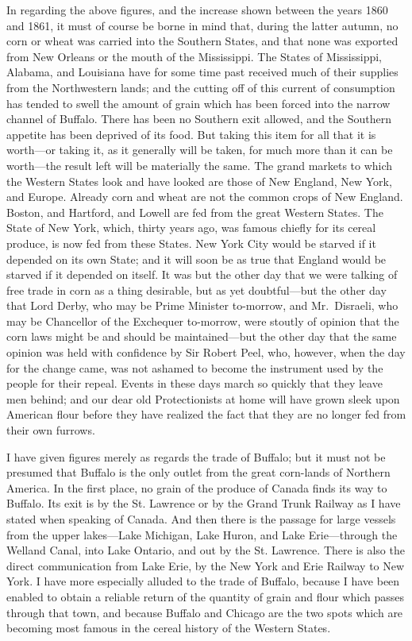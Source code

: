 In regarding the above figures, and the increase shown between the
years 1860 and 1861, it must of course be borne in mind that,
during the latter autumn, no corn or wheat was carried into the
Southern States, and that none was exported from New Orleans or the
mouth of the Mississippi.  The States of Mississippi, Alabama, and
Louisiana have for some time past received much of their supplies
from the Northwestern lands; and the cutting off of this current of
consumption has tended to swell the amount of grain which has been
forced into the narrow channel of Buffalo.  There has been no
Southern exit allowed, and the Southern appetite has been deprived
of its food.  But taking this item for all that it is worth---or
taking it, as it generally will be taken, for much more than it can
be worth---the result left will be materially the same.  The grand
markets to which the Western States look and have looked are those
of New England, New York, and Europe.  Already corn and wheat are
not the common crops of New England.  Boston, and Hartford, and
Lowell are fed from the great Western States.  The State of New
York, which, thirty years ago, was famous chiefly for its cereal
produce, is now fed from these States.  New York City would be
starved if it depended on its own State; and it will soon be as
true that England would be starved if it depended on itself.  It
was but the other day that we were talking of free trade in corn as
a thing desirable, but as yet doubtful---but the other day that Lord
Derby, who may be Prime Minister to-morrow, and Mr.\ Disraeli, who
may be Chancellor of the Exchequer to-morrow, were stoutly of
opinion that the corn laws might be and should be maintained---but
the other day that the same opinion was held with confidence by Sir
Robert Peel, who, however, when the day for the change came, was
not ashamed to become the instrument used by the people for their
repeal.  Events in these days march so quickly that they leave men
behind; and our dear old Protectionists at home will have grown
sleek upon American flour before they have realized the fact that
they are no longer fed from their own furrows.

I have given figures merely as regards the trade of Buffalo; but it
must not be presumed that Buffalo is the only outlet from the great
corn-lands of Northern America.  In the first place, no grain of
the produce of Canada finds its way to Buffalo.  Its exit is by the
St. Lawrence or by the Grand Trunk Railway as I have stated when
speaking of Canada.  And then there is the passage for large
vessels from the upper lakes---Lake Michigan, Lake Huron, and Lake
Erie---through the Welland Canal, into Lake Ontario, and out by the
St. Lawrence.  There is also the direct communication from Lake
Erie, by the New York and Erie Railway to New York.  I have more
especially alluded to the trade of Buffalo, because I have been
enabled to obtain a reliable return of the quantity of grain and
flour which passes through that town, and because Buffalo and
Chicago are the two spots which are becoming most famous in the
cereal history of the Western States.

